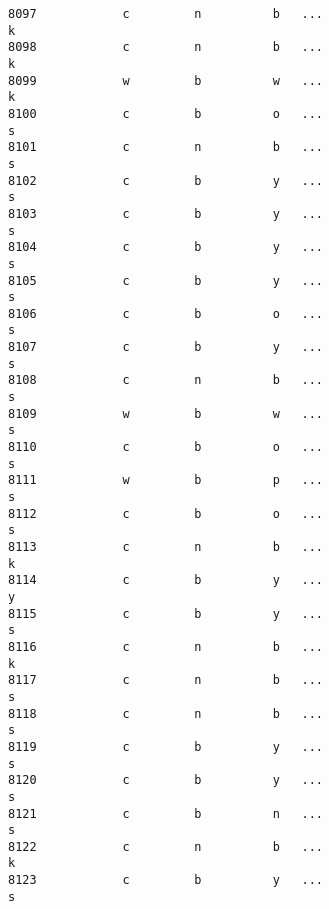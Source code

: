 \documentclass[11pt]{article}
\begin{document}
\begin{verbatim}
8097            c         n          b   ...                          k   
8098            c         n          b   ...                          k   
8099            w         b          w   ...                          k   
8100            c         b          o   ...                          s   
8101            c         n          b   ...                          s   
8102            c         b          y   ...                          s   
8103            c         b          y   ...                          s   
8104            c         b          y   ...                          s   
8105            c         b          y   ...                          s   
8106            c         b          o   ...                          s   
8107            c         b          y   ...                          s   
8108            c         n          b   ...                          s   
8109            w         b          w   ...                          s   
8110            c         b          o   ...                          s   
8111            w         b          p   ...                          s   
8112            c         b          o   ...                          s   
8113            c         n          b   ...                          k   
8114            c         b          y   ...                          y   
8115            c         b          y   ...                          s   
8116            c         n          b   ...                          k   
8117            c         n          b   ...                          s   
8118            c         n          b   ...                          s   
8119            c         b          y   ...                          s   
8120            c         b          y   ...                          s   
8121            c         b          n   ...                          s   
8122            c         n          b   ...                          k   
8123            c         b          y   ...                          s   


\end{verbatim}
\end{document}
